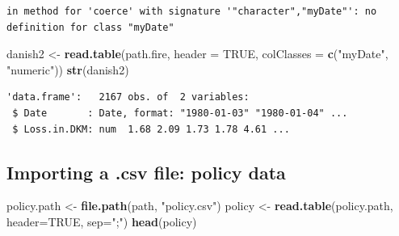 \documentclass[
]{book}
\newenvironment{Shaded}{\begin{snugshade}}{\end{snugshade}}
\newcommand{\DataTypeTok}[1]{\textcolor[rgb]{0.13,0.29,0.53}{#1}}
\newcommand{\KeywordTok}[1]{\textcolor[rgb]{0.13,0.29,0.53}{\textbf{#1}}}
\newcommand{\NormalTok}[1]{#1}
\newcommand{\OtherTok}[1]{\textcolor[rgb]{0.56,0.35,0.01}{#1}}
\newcommand{\StringTok}[1]{\textcolor[rgb]{0.31,0.60,0.02}{#1}}
\begin{document}
\begin{verbatim}
in method for 'coerce' with signature '"character","myDate"': no definition for class "myDate"
\end{verbatim}

\begin{Shaded}
\begin{Highlighting}[]
\NormalTok{danish2 <-}\StringTok{ }\KeywordTok{read.table}\NormalTok{(path.fire, }\DataTypeTok{header =} \OtherTok{TRUE}\NormalTok{, }\DataTypeTok{colClasses =} \KeywordTok{c}\NormalTok{(}\StringTok{"myDate"}\NormalTok{, }\StringTok{"numeric"}\NormalTok{))}
\KeywordTok{str}\NormalTok{(danish2)}
\end{Highlighting}
\end{Shaded}

\begin{verbatim}
'data.frame':	2167 obs. of  2 variables:
 $ Date       : Date, format: "1980-01-03" "1980-01-04" ...
 $ Loss.in.DKM: num  1.68 2.09 1.73 1.78 4.61 ...
\end{verbatim}

\hypertarget{importing-a-.csv-file-policy-data}{%
\subsection{Importing a .csv file: policy data}\label{importing-a-.csv-file-policy-data}}

\begin{Shaded}
\begin{Highlighting}[]
\NormalTok{policy.path <-}\StringTok{ }\KeywordTok{file.path}\NormalTok{(path, }\StringTok{"policy.csv"}\NormalTok{)}
\NormalTok{policy <-}\StringTok{ }\KeywordTok{read.table}\NormalTok{(policy.path, }\DataTypeTok{header=}\OtherTok{TRUE}\NormalTok{, }\DataTypeTok{sep=}\StringTok{";"}\NormalTok{)}
\KeywordTok{head}\NormalTok{(policy)}
\end{Highlighting}
\end{Shaded}
\end{document}

